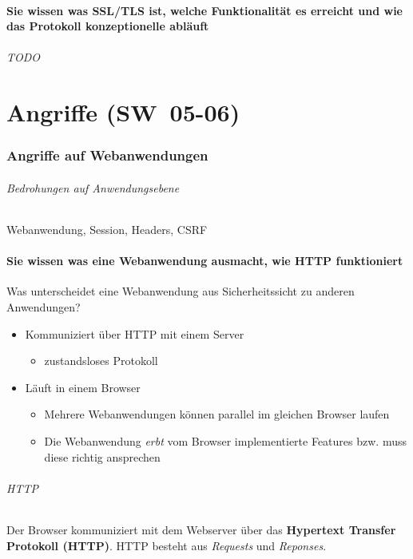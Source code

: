 \documentclass[10pt,a4paper]{article}
\begin{document}
\subsection*{Sie wissen was SSL/TLS ist, welche Funktionalität es erreicht und wie das Protokoll konzeptionelle abläuft}
\paragraph*{TODO}



\part{Angriffe (SW~05-06)}
\section{Angriffe auf Webanwendungen}
\paragraph*{Bedrohungen auf Anwendungsebene}Webanwendung, Session, Headers, CSRF
\subsection*{Sie wissen was eine Webanwendung ausmacht, wie HTTP funktioniert}
Was unterscheidet eine Webanwendung aus Sicherheitssicht zu anderen Anwendungen?
\begin{itemize}[noitemsep,topsep=0pt,leftmargin=*]
    \item Kommuniziert über HTTP mit einem Server
    \begin{itemize}[noitemsep,topsep=0pt,leftmargin=*]
        \item zustandsloses Protokoll
    \end{itemize}
    \item Läuft in einem Browser
    \begin{itemize}[noitemsep,topsep=0pt,leftmargin=*]
        \item Mehrere Webanwendungen können parallel im gleichen Browser laufen
        \item Die Webanwendung \textsl{erbt} vom Browser implementierte Features
        bzw. muss diese richtig ansprechen
    \end{itemize}
\end{itemize}
\paragraph*{HTTP}Der Browser kommuniziert mit dem Webserver über das \textbf{Hypertext Transfer Protokoll (HTTP)}. HTTP besteht aus \textsl{Requests} und \textsl{Reponses}.
\end{document}

